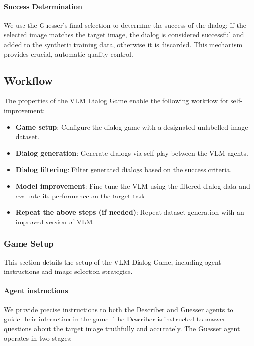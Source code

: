 \paragraph{Success Determination}
We use the Guesser's final selection to determine the success of the dialog: If the selected image matches the target image, the dialog is considered successful and added to the synthetic training data, otherwise it is discarded. 
This mechanism provides crucial, automatic quality control.

\subsection{Workflow}
\label{method:workflow}

The properties of the VLM Dialog Game enable the following workflow for self-improvement:

\begin{itemize}
    \item \textbf{Game setup}: Configure the dialog game with a designated unlabelled image dataset.
    \item \textbf{Dialog generation}: Generate dialogs via self-play between the VLM agents.
    \item \textbf{Dialog filtering}: Filter generated dialogs based on the success criteria.
    \item \textbf{Model improvement}: Fine-tune the VLM using the filtered dialog data and evaluate its performance on the target task.
    \item \textbf{Repeat the above steps (if needed)}: Repeat dataset generation with an improved version of VLM.
\end{itemize}

\subsubsection{Game Setup}
\label{method:impldet}

This section details the setup of the VLM Dialog Game, including agent instructions and image selection strategies.

\paragraph{Agent instructions}
We provide precise instructions to both the Describer and Guesser agents to guide their interaction in the game. 
The Describer is instructed to answer questions about the target image truthfully and accurately.
The Guesser agent operates in two stages:


